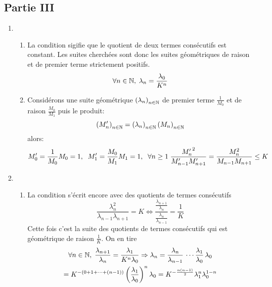 \subsection*{Partie III}
\begin{enumerate}
  \item 
\begin{enumerate}
  \item La condition sigifie que le quotient de deux termes consécutifs est constant. Les suites cherchées sont donc les suites géométriques de raison et de premier terme strictement positifs. 
\begin{displaymath}
\forall n \in \mathbb{N}, \; \lambda_n = \frac{\lambda_0}{K^n}  
\end{displaymath}

  
  \item Considérons une suite géométrique $\left( \lambda_n\right)_{n\in \mathbb{N}}$ de premier terme $\frac{1}{M_0}$ et de raison $\frac{M_0}{M_1}$ puis le produit:
\begin{displaymath}
  \left( M'_n\right)_{n\in \mathbb{N}} = \left( \lambda_n\right)_{n\in \mathbb{N}} \left( M_n\right)_{n\in \mathbb{N}} 
\end{displaymath}
alors:
\begin{displaymath}
  M'_0 = \frac{1}{M_0}M_0 = 1, \hspace{0.2cm}
  M'_1 = \frac{M_0}{M_1}M_1 = 1, \hspace{0.2cm}
\forall n \geq 1\; \frac{{M'_n}^2}{M'_{n-1}M'_{n+1}} =  \frac{M_n^2}{M_{n-1}M_{n+1}} \leq K 
\end{displaymath}

\end{enumerate}

  \item
\begin{enumerate}
  \item La condition s'écrit encore avec des quotients de termes consécutifs
\begin{displaymath}
\frac{\lambda_n^2}{\lambda_{n-1}\lambda_{n+1}} = K \Leftrightarrow \frac{\frac{\lambda_{n+1}}{\lambda_n}}{\frac{\lambda_{n}}{\lambda_{n-1}}} = \frac{1}{K}  
\end{displaymath}
Cette fois c'est la suite des quotients de termes consécutifs qui est géométrique de raison $\frac{1}{K}$. On en tire
\begin{multline*}
\forall n \in \mathbb{N},\;
\frac{\lambda_{n+1}}{\lambda_{n}} = \frac{\lambda_1}{K^{n}\lambda_0}
\Rightarrow \lambda_n = \frac{\lambda_n}{\lambda_{n-1}} \, \cdots \frac{\lambda_1}{\lambda_0}\, \lambda_0 \\
= K^{-\left( 0+1+\cdots+(n-1)\right) }\left( \frac{\lambda_1}{\lambda_0}\right) ^{n} \lambda_0 
= K^{-\frac{n(n-1)}{2}}\lambda_1^{n}\lambda_0^{1-n}
\end{multline*}


\end{enumerate}
\end{enumerate}
